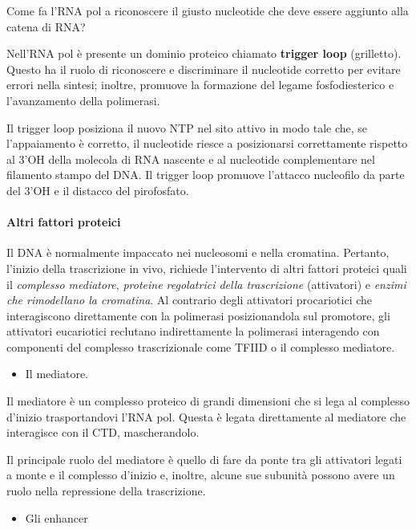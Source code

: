 \documentclass[11pt]{book}
\begin{document}
Come fa l'RNA pol a riconoscere il giusto nucleotide che deve essere
aggiunto alla catena di RNA?

Nell'RNA pol è presente un dominio proteico chiamato \textbf{trigger
loop} (grilletto). Questo ha il ruolo di riconoscere e discriminare il
nucleotide corretto per evitare errori nella sintesi; inoltre, promuove
la formazione del legame fosfodiesterico e l'avanzamento della
polimerasi.

Il trigger loop posiziona il nuovo NTP nel sito attivo in modo tale che,
se l'appaiamento è corretto, il nucleotide riesce a posizionarsi
correttamente rispetto al 3'OH della molecola di RNA nascente e al
nucleotide complementare nel filamento stampo del DNA. Il trigger loop
promuove l'attacco nucleofilo da parte del 3'OH e il distacco del
pirofosfato.

\paragraph{Altri fattori proteici}\label{altri-fattori-proteici}

Il DNA è normalmente impaccato nei nucleosomi e nella cromatina.
Pertanto, l'inizio della trascrizione in vivo, richiede l'intervento di
altri fattori proteici quali il \emph{complesso mediatore},
\emph{proteine regolatrici della trascrizione} (attivatori) e
\emph{enzimi che rimodellano la cromatina}. Al contrario degli
attivatori procariotici che interagiscono direttamente con la polimerasi
posizionandola sul promotore, gli attivatori eucariotici reclutano
indirettamente la polimerasi interagendo con componenti del complesso
trascrizionale come TFIID o il complesso mediatore.

\begin{itemize}
\itemsep1pt\parskip0pt
\item
  Il mediatore.
\end{itemize}

Il mediatore è un complesso proteico di grandi dimensioni che si lega al
complesso d'inizio trasportandovi l'RNA pol. Questa è legata
direttamente al mediatore che interagisce con il CTD, mascherandolo.

Il principale ruolo del mediatore è quello di fare da ponte tra gli
attivatori legati a monte e il complesso d'inizio e, inoltre, alcune sue
subunità possono avere un ruolo nella repressione della trascrizione.

\begin{itemize}
\itemsep1pt\parskip0pt
\item
  Gli enhancer
\end{itemize}
\end{document}
